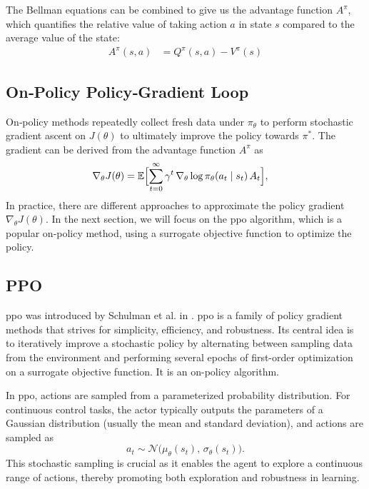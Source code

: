 The Bellman equations can be combined to give us the advantage function \(A^\pi\), which quantifies the relative value of taking action \(a\) in state \(s\) compared to the average value of the state:
\begin{align}
\label{eq:advantage}
A^\pi(s,a)
&= Q^\pi(s,a) - V^\pi(s)
\end{align}

\subsection{On‐Policy Policy‐Gradient Loop}  
On‐policy methods repeatedly collect fresh data under \(\pi_\theta\) to perform stochastic gradient ascent on \(J(\theta)\) to ultimately improve the policy towards \(\pi^*\). The gradient can be derived from the advantage function \(A^\pi\) as
\begin{align}
\label{eq:policy_gradient}
\nabla_\theta J(\theta)
&= \mathbb{E}\Bigl[\sum_{t=0}^\infty \gamma^t\,\nabla_\theta \log \pi_\theta(a_t\mid s_t)\,A_t\Bigr],
\end{align}
In practice, there are different approaches to approximate the policy gradient \(\nabla_{\theta}J(\theta)\). In the next section, we will focus on the \gls{ppo} algorithm, which is a popular on‐policy method, using a surrogate objective function to optimize the policy.

\subsection{PPO}
\gls{ppo} was introduced by Schulman et al. in \cite{schulman2017proximal}. \gls{ppo} is a family of policy gradient methods that strives for simplicity, efficiency, and robustness. Its central idea is to iteratively improve a stochastic policy by alternating between sampling data from the environment and performing several epochs of first-order optimization on a surrogate objective function. It is an on-policy algorithm.

In \gls{ppo}, actions are sampled from a parameterized probability distribution. For continuous control tasks, the actor typically outputs the parameters of a Gaussian distribution (usually the mean and standard deviation), and actions are sampled as
\[
a_t \sim \mathcal{N}\big(\mu_\theta(s_t),\, \sigma_\theta(s_t)\big).
\]
This stochastic sampling is crucial as it enables the agent to explore a continuous range of actions, thereby promoting both exploration and robustness in learning.

